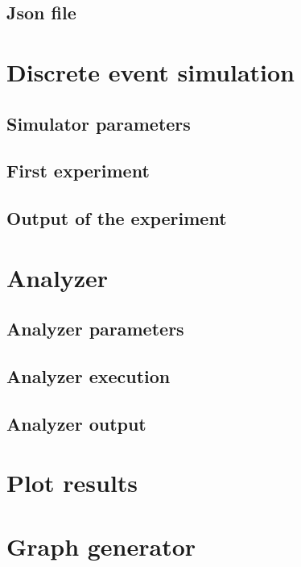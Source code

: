 \documentclass[10pt,journal,onecolumn]{IEEEtran}
\begin{document}
\subsection{Json file}
\label{subsec:json_file}

\section{Discrete event simulation}
\label{sec:des}

\subsection{Simulator parameters}
\label{subsec:des_param}

\subsection{First experiment}
\label{subsec:first_exp}

\subsection{Output of the experiment}
\label{subsec:des_output}

\section{Analyzer}
\label{sec:analyzer}

\subsection{Analyzer parameters}
\label{subsec:anal_param}

\subsection{Analyzer execution}
\label{subsec:anal_exec}

\subsection{Analyzer output}
\label{subsec:anal_output}

\section{Plot results}
\label{sec:plot_results}

\section{Graph generator}
\label{sec:graph_generator}
\end{document}

